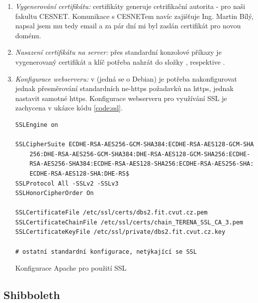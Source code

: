 \begin{enumerate}
	\item \emph{Vygenerování certifikátu:} certifikáty generuje cetrifikační autorita - pro naši fakultu CESNET. Komunikace s CESNETem navíc zajišťuje Ing. Martin Bílý, napsal jsem mu tedy email a za pár dní mi byl zaslán certifikát pro novou doménu.
	\item \emph{Nasazení certifikátu na server:} přes standardní konzolové příkazy je vygenerovaný certifikát a klíč potřeba nahrát do složky , respektive .
	\item \emph{Konfigurace webserveru:} v  (jedná se o Debian) je potřeba nakonfigurovat jednak přesměrování standardních ne-https požadavků na https, jednak nastavit samotné https. Konfigurace  webserveru pro využívání SSL je zachycena v ukázce kódu \ref{code:ssl}.
	\begin{listing}
		\expandafter\def\csname PY@tok@err\endcsname{} %
		\begin{verbatim}
SSLEngine on

SSLCipherSuite ECDHE-RSA-AES256-GCM-SHA384:ECDHE-RSA-AES128-GCM-SHA
    256:DHE-RSA-AES256-GCM-SHA384:DHE-RSA-AES128-GCM-SHA256:ECDHE-
    RSA-AES256-SHA384:ECDHE-RSA-AES128-SHA256:ECDHE-RSA-AES256-SHA:
    ECDHE-RSA-AES128-SHA:DHE-RS$
SSLProtocol All -SSLv2 -SSLv3
SSLHonorCipherOrder On

SSLCertificateFile /etc/ssl/certs/dbs2.fit.cvut.cz.pem
SSLCertificateChainFile /etc/ssl/certs/chain_TERENA_SSL_CA_3.pem
SSLCertificateKeyFile /etc/ssl/private/dbs2.fit.cvut.cz.key

# ostatní standardní konfigurace, netýkající se SSL
		\end{verbatim}
		\caption{Konfigurace Apache pro použití SSL} \label{code:ssl}
	\end{listing}
\end{enumerate}

\subsection{Shibboleth} \label{app:shibboleth}

